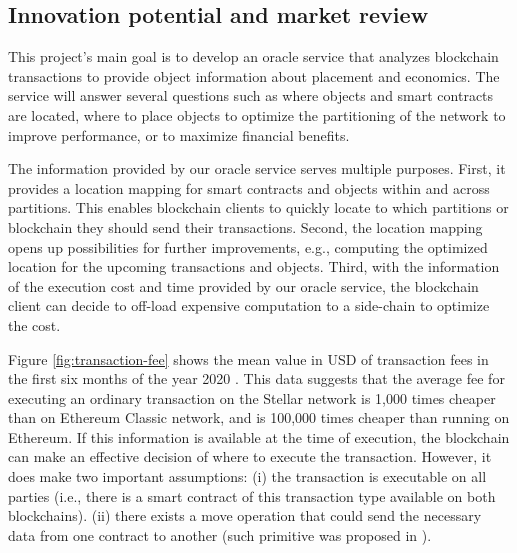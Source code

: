 \subsection{Innovation potential and market review} 

This project's main goal is to develop an oracle service that analyzes
blockchain transactions to provide object information about placement and economics. The service
will answer several questions such as where objects and smart contracts are located, where to place objects
to optimize the partitioning of the network to improve performance, or to maximize financial benefits.

The information provided by our oracle service serves multiple purposes. First,
it provides a location mapping for smart contracts and objects within and across
partitions. This enables blockchain clients to quickly locate to which
partitions or blockchain they should send their transactions. Second, the
location mapping opens up possibilities for further improvements, e.g.,
computing the optimized location for the upcoming transactions and objects.
Third, with the information of the execution cost and time provided by our
oracle service, the blockchain client can decide to off-load expensive
computation to a side-chain to optimize the cost.



Figure \ref{fig:transaction-fee} shows the mean value in USD of transaction
fees in the first six months of the year 2020 \cite{transactionfee}. This data
suggests that the average fee for executing an ordinary transaction on the Stellar
network is 1,000 times cheaper than on Ethereum Classic network, and is 100,000
times cheaper than running on Ethereum. If this information is available at the
time of execution, the blockchain can make an effective decision of where to
execute the transaction. However, it does make two important assumptions: (i)
the transaction is executable on all parties (i.e., there is a smart contract of
this transaction type available on both blockchains). (ii) there exists a move
operation that could send the necessary data from one contract to another (such
primitive was proposed in \cite{fynn2020move}).

